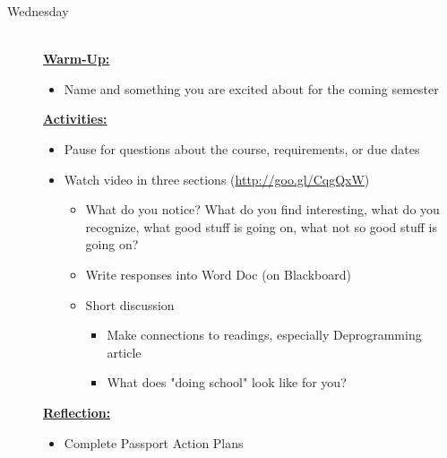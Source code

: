 \documentclass{tufte-handout}
\newcommand{\listwed}{\item[Wednesday] \hfill \\}
\newenvironment{daywu}
	{\textbf{\underline{Warm-Up:}} \hfill \\
	\begin{itemize}}
	{\end{itemize}}
\newenvironment{dayact}
	{\textbf{\underline{Activities:}} \hfill \\
	\begin{itemize}}
	{\end{itemize}}
\newenvironment{dayref}
	{\textbf{\underline{Reflection:}} \hfill \\
	\begin{itemize}}
	{\end{itemize}}
\newenvironment{weeksched}
	{\noindent
	\begin{description}}
	{\end{description}
	\newpage}
\begin{document}
\begin{fullwidth}
\begin{weeksched}
\listwed
\begin{daywu}
	\item Name and something you are excited about for the coming semester
\end{daywu}
\begin{dayact}
	\item Pause for questions about the course, requirements, or due dates
	\item Watch video in three sections (\url{http://goo.gl/CqgQxW})
	\begin{itemize}
		\item What do you notice? What do you find interesting, what do you recognize, what good stuff is going on, what not so good stuff is going on?
		\item Write responses into Word Doc (on Blackboard)
		\item Short discussion
		\begin{itemize}
			\item Make connections to readings, especially Deprogramming article
			\item What does "doing school" look like for you?
		\end{itemize}
	\end{itemize}
\end{dayact}
\begin{dayref}
	\item Complete Passport Action Plans
\end{dayref}


\end{weeksched}
\end{fullwidth}
\end{document}
